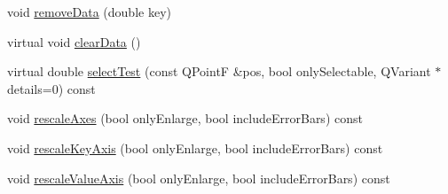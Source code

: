 \begin{DoxyCompactItemize}
void \hyperlink{class_q_c_p_graph_a4a706020b4318f118381648ef18aca3f}{remove\+Data} (double key)
\item 
virtual void \hyperlink{class_q_c_p_graph_ad4e94a4e44e5e76fbec81a72a977157d}{clear\+Data} ()
\item 
virtual double \hyperlink{class_q_c_p_graph_a36011c34aca4f7a477de25961e2f6c13}{select\+Test} (const Q\+PointF \&pos, bool only\+Selectable, Q\+Variant $\ast$details=0) const
\item 
void \hyperlink{class_q_c_p_graph_a9c3909d6116e9d03978f057d41174e6a}{rescale\+Axes} (bool only\+Enlarge, bool include\+Error\+Bars) const
\item 
void \hyperlink{class_q_c_p_graph_a051fb77b459ba1ae8d65552c67f45e94}{rescale\+Key\+Axis} (bool only\+Enlarge, bool include\+Error\+Bars) const
\item 
void \hyperlink{class_q_c_p_graph_a9e0e620a56932c4df80a3762c2f93608}{rescale\+Value\+Axis} (bool only\+Enlarge, bool include\+Error\+Bars) const
\end{DoxyCompactItemize}
